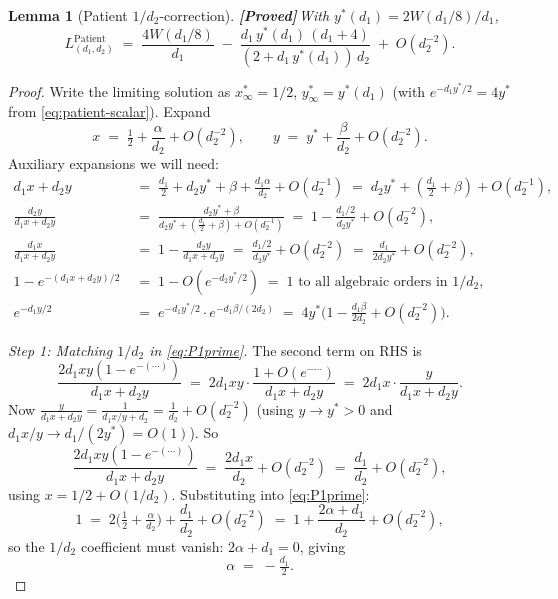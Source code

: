 \documentclass{article}
\theoremstyle{plain}
\newtheorem{lemma}{Lemma}
\theoremstyle{definition}
\newcommand{\proved}{\textcolor{provedgreen}{\textbf{[Proved]}}\,}
\begin{document}
\begin{lemma}[Patient $1/d_2$-correction]\label{lem:patient-correction}
\proved With $y^\ast(d_1)=2W(d_1/8)/d_1$,
\[
L^{\text{Patient}}_{(d_1,d_2)}\;=\;\frac{4W(d_1/8)}{d_1}\;-\;\frac{d_1\,y^\ast(d_1)\,(d_1+4)}{(2+d_1\,y^\ast(d_1))\,d_2}\;+\;O(d_2^{-2}).
\]
\end{lemma}

\begin{proof}
Write the limiting solution as $x^\ast_\infty=1/2$, $y^\ast_\infty=y^\ast(d_1)$ (with $e^{-d_1 y^\ast/2}=4y^\ast$ from \eqref{eq:patient-scalar}). Expand
\[
x\;=\;\tfrac12+\frac{\alpha}{d_2}+O(d_2^{-2}),\qquad y\;=\;y^\ast+\frac{\beta}{d_2}+O(d_2^{-2}).
\]
Auxiliary expansions we will need:
\begin{align*}
d_1 x+d_2 y &\;=\;\tfrac{d_1}{2}+d_2 y^\ast+\beta+\tfrac{d_1\alpha}{d_2}+O(d_2^{-1})\;=\;d_2 y^\ast+(\tfrac{d_1}{2}+\beta)+O(d_2^{-1}),\\
\frac{d_2 y}{d_1 x+d_2 y} &\;=\;\frac{d_2 y^\ast+\beta}{d_2 y^\ast+(\tfrac{d_1}{2}+\beta)+O(d_2^{-1})}\;=\;1-\frac{d_1/2}{d_2 y^\ast}+O(d_2^{-2}),\\
\frac{d_1 x}{d_1 x+d_2 y} &\;=\;1-\frac{d_2 y}{d_1 x+d_2 y}\;=\;\frac{d_1/2}{d_2 y^\ast}+O(d_2^{-2})\;=\;\frac{d_1}{2 d_2 y^\ast}+O(d_2^{-2}),\\
1-e^{-(d_1 x+d_2 y)/2}&\;=\;1-O(e^{-d_2 y^\ast/2})\;=\;1\text{ to all algebraic orders in }1/d_2,\\
e^{-d_1 y/2}&\;=\;e^{-d_1 y^\ast/2}\cdot e^{-d_1\beta/(2 d_2)}\;=\;4y^\ast\bigl(1-\tfrac{d_1\beta}{2 d_2}+O(d_2^{-2})\bigr).
\end{align*}

\emph{Step 1: Matching $1/d_2$ in \eqref{eq:P1prime}.} The second term on RHS is
\[
\frac{2 d_1 xy(1-e^{-(\cdots)})}{d_1 x+d_2 y}\;=\;2 d_1 x y\cdot\frac{1+O(e^{-\cdots})}{d_1 x+d_2 y}\;=\;2 d_1 x\cdot\frac{y}{d_1 x+d_2 y}.
\]
Now $\frac{y}{d_1 x+d_2 y}=\frac{1}{d_1 x/y+d_2}=\frac{1}{d_2}+O(d_2^{-2})$ (using $y\to y^\ast>0$ and $d_1 x/y\to d_1/(2y^\ast)=O(1)$). So
\[
\frac{2 d_1 xy(1-e^{-(\cdots)})}{d_1 x+d_2 y}\;=\;\frac{2 d_1 x}{d_2}+O(d_2^{-2})\;=\;\frac{d_1}{d_2}+O(d_2^{-2}),
\]
using $x=1/2+O(1/d_2)$. Substituting into \eqref{eq:P1prime}:
\[
1\;=\;2\bigl(\tfrac12+\tfrac{\alpha}{d_2}\bigr)+\frac{d_1}{d_2}+O(d_2^{-2})\;=\;1+\frac{2\alpha+d_1}{d_2}+O(d_2^{-2}),
\]
so the $1/d_2$ coefficient must vanish: $2\alpha+d_1=0$, giving
\[
\alpha\;=\;-\tfrac{d_1}{2}.
\]


\end{proof}
\end{document}
